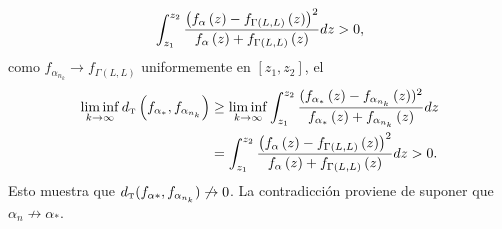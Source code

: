 \begin{dem}
	\begin{align*}
	\int_{z_{1}}^{z_{2}}\frac{\left( f_{\alpha}\left( z \right)-f_{\Gamma(L,L)}\left( z \right) \right)^{2}}
	{f_{\alpha}\left( z \right)+f_{\Gamma(L,L)}\left( z \right)}dz >0,
	\end{align*}
	como $f_{\alpha_{n_{k}}} \to f_{\Gamma(L,L)}$ uniformemente en $[z_{1},z_{2}]$, el
	\begin{align*}
	\liminf_{k\to\infty} d_{\text{\tiny{T}}}\left( f_{\alpha_{*}}, f_{\alpha_{n_{k}}} \right) 
	& \ge \liminf_{k\to\infty}  \int_{z_{1}}^{z_{2}}\frac{(f_{\alpha_{*}}\left( z \right)-f_{\alpha_{n_{k}}}\left( z \right))^{2}}
	{f_{\alpha_{*}}\left( z \right) + f_{\alpha_{n_{k}}}\left( z \right)}dz \\
	& = \int_{z_{1}}^{z_{2}}\frac{\left( f_{\alpha}\left( z \right)-f_{\Gamma(L,L)}\left( z \right) \right)^{2}}
	{f_{\alpha}\left( z \right)+f_{\Gamma(L,L)}\left( z \right)}dz >0.
	\end{align*}
	Esto muestra que $d_{\text{\tiny{T}}}(f_{\alpha*}, f_{\alpha_{n_{k}}}) \not\to 0$.
	La contradicción proviene de suponer que $\alpha_{n} \not\to \alpha_{*}$.
\end{dem}

